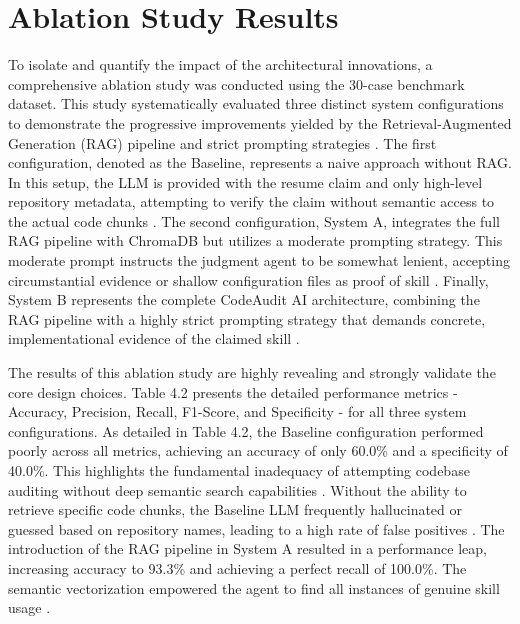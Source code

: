 \section{Ablation Study Results}

To isolate and quantify the impact of the architectural innovations, a comprehensive ablation study was conducted using the 30-case benchmark dataset. This study systematically evaluated three distinct system configurations to demonstrate the progressive improvements yielded by the Retrieval-Augmented Generation (RAG) pipeline and strict prompting strategies \cite{ref30, ref68}. The first configuration, denoted as the Baseline, represents a naive approach without RAG. In this setup, the LLM is provided with the resume claim and only high-level repository metadata, attempting to verify the claim without semantic access to the actual code chunks \cite{ref32}. The second configuration, System A, integrates the full RAG pipeline with ChromaDB but utilizes a moderate prompting strategy. This moderate prompt instructs the judgment agent to be somewhat lenient, accepting circumstantial evidence or shallow configuration files as proof of skill \cite{ref70}. Finally, System B represents the complete CodeAudit AI architecture, combining the RAG pipeline with a highly strict prompting strategy that demands concrete, implementational evidence of the claimed skill \cite{ref20, ref52}.

The results of this ablation study are highly revealing and strongly validate the core design choices. Table 4.2 presents the detailed performance metrics - Accuracy, Precision, Recall, F1-Score, and Specificity - for all three system configurations. As detailed in Table 4.2, the Baseline configuration performed poorly across all metrics, achieving an accuracy of only 60.0\% and a specificity of 40.0\%. This highlights the fundamental inadequacy of attempting codebase auditing without deep semantic search capabilities \cite{ref2}. Without the ability to retrieve specific code chunks, the Baseline LLM frequently hallucinated or guessed based on repository names, leading to a high rate of false positives \cite{ref56}. The introduction of the RAG pipeline in System A resulted in a performance leap, increasing accuracy to 93.3\% and achieving a perfect recall of 100.0\%. The semantic vectorization empowered the agent to find all instances of genuine skill usage \cite{ref44, ref6}.

